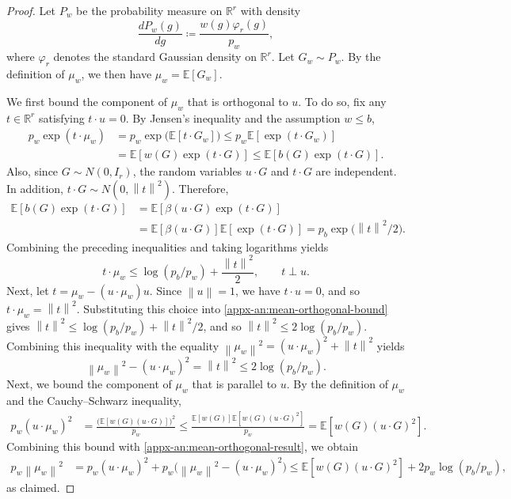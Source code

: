 \documentclass[11pt,letterpaper]{article}
\theoremstyle{remark}
\newcommand{\E}{\mathbb E}
\newcommand{\R}{\mathbb R}
\newcommand{\norm}[1]{\left\lVert#1\right\rVert}
\begin{document}
\begin{proof}
Let $P_w$ be the probability measure on $\R^r$ with density
\[
\frac{d P_w(g)}{dg}\coloneqq \frac{w(g)\varphi_r(g)}{p_w},
\]
where $\varphi_r$ denotes the standard Gaussian density
on $\R^r$. Let $G_w\sim P_w$. By the definition of
$\mu_w$, we then have $\mu_w=\E[G_w]$.

We first bound the component of $\mu_w$ that is orthogonal to $u$. To do so, fix any \(t\in\R^r\) satisfying \(t\cdot u=0\).
By Jensen's inequality and the assumption \(w\le b\),
\begin{align*}
p_w\exp(t\cdot\mu_w)
&=p_w\exp\bigl(\E[t\cdot G_w]\bigr)
\le p_w\E[\exp(t\cdot G_w)]\\
&=\E[w(G)\exp(t\cdot G)]
\le\E[b(G)\exp(t\cdot G)].
\end{align*}
Also, since \(G\sim N(0,I_r)\),
the random variables \(u\cdot G\) and \(t\cdot G\)
are independent. In addition, \(t\cdot G\sim N(0,\norm{t}^2)\). Therefore,
\begin{align*}
\E[b(G)\exp(t\cdot G)]
&=\E[\beta(u\cdot G)\exp(t\cdot G)]\\
&=\E[\beta(u\cdot G)]\E[\exp(t\cdot G)]
=p_b\exp\bigl(\norm{t}^2/2\bigr).
\end{align*}
Combining the preceding inequalities and taking
logarithms yields
\begin{equation}
t\cdot\mu_w
\le \log(p_b/p_w)+\frac{\norm{t}^2}{2},
\qquad t\perp u.
\label{appx-an:mean-orthogonal-bound}
\end{equation}
Next, let $t=\mu_w-(u\cdot\mu_w)u$.
Since \(\norm{u}=1\), we have \(t\cdot u=0\), and so
$ t\cdot\mu_w =\norm{t}^2$.
Substituting this choice into
\eqref{appx-an:mean-orthogonal-bound} gives
$\norm{t}^2 \le \log(p_b/p_w)+\norm{t}^2/2$, and so $\norm{t}^2\leq 2\log(p_b/p_w)$.
Combining this inequality with the equality $\norm{\mu_w}^2 = (u\cdot\mu_w)^2 + \norm{t}^2$ yields
\begin{equation}
\norm{\mu_w}^2-(u\cdot\mu_w)^2
=\norm{t}^2
\le 2\log(p_b/p_w).
\label{appx-an:mean-orthogonal-result}
\end{equation}
Next, we bound the component of $\mu_w$ that is parallel to \(u\). By the definition of \(\mu_w\)
and the Cauchy--Schwarz inequality,
\begin{align*}
p_w(u\cdot\mu_w)^2
&=\frac{\bigl(\E[w(G)(u\cdot G)]\bigr)^2}{p_w}
\le
\frac{\E[w(G)]\E[w(G)(u\cdot G)^2]}{p_w}
=\E[w(G)(u\cdot G)^2].
\end{align*}
Combining this bound with \eqref{appx-an:mean-orthogonal-result},
we obtain
\begin{align*}
p_w\norm{\mu_w}^2
&=p_w(u\cdot\mu_w)^2
 +p_w\bigl(\norm{\mu_w}^2-(u\cdot\mu_w)^2\bigr)
 \le \E[w(G)(u\cdot G)^2]
 +2p_w\log(p_b/p_w),
\end{align*}
as claimed.
\end{proof}
\end{document}

